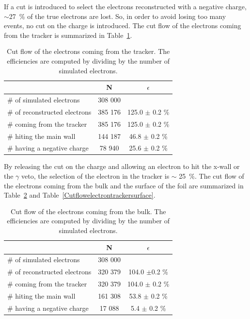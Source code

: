 \documentclass[main.tex]{subfiles}
\begin{document}
\bigskip 


\noindent If a cut is introduced to select the electrons reconstructed with a negative charge, $\sim$27~\% of the true electrons are lost. So, in order to avoid losing too many events, no cut on the charge is introduced. The cut flow of the electrons coming from the tracker is summarized in Table~\ref{Cutflowelectrontracker}. 

\begin{table}[h!]
\begin{center}
\begin{tabular}{l|c|c}
 & N & $\epsilon$ \\
\toprule
$\#$ of simulated electrons & 308 000 & \\
\hline
$\#$ of reconstructed electrons & 385 176 & 125.0 $\pm$ 0.2 \% \\
$\#$ coming from the tracker    & 385 176 & 125.0 $\pm$ 0.2 \%\\
$\#$ hiting the main wall       & 144 187 & 46.8  $\pm$ 0.2 \%\\
$\#$ having a negative charge   & 78 940  & 25.6  $\pm$ 0.2 \%\\
\bottomrule
\end{tabular}
\end{center}
\caption{Cut flow of the electrons coming from the tracker. The efficiencies are computed by dividing by the number of simulated electrons.}
\label{Cutflowelectrontracker}
\end{table}


\bigskip


\noindent By releasing the cut on the charge and allowing an electron to hit the x-wall or the $\gamma$ veto, the selection of the electron in the tracker is $\sim$ 25~\%. The cut flow of the electrons coming from the bulk and the surface of the foil are summarized in Table~\ref{Cutflowelectrontrackerbulk} and Table~\ref{Cutflowelectrontrackersurface}.


\begin{table}[h!]
\begin{center}
\begin{tabular}{l|c|c}
 & N & $\epsilon$ \\
\toprule
$\#$ of simulated electrons & 308 000 & \\
\hline
$\#$ of reconstructed electrons & 320 379 & 104.0 $\pm $0.2 \% \\
$\#$ coming from the tracker    & 320 379 & 104.0 $\pm$ 0.2 \%\\
$\#$ hiting the main wall       & 161 308 & 53.8 $\pm$ 0.2 \%\\
$\#$ having a negative charge   & 17 088  & 5.4 $\pm$ 0.2 \%\\
\bottomrule
\end{tabular}
\end{center}
\caption{Cut flow of the electrons coming from the bulk. The efficiencies are computed by dividing by the number of simulated electrons.}
\label{Cutflowelectrontrackerbulk}
\end{table}
\end{document}
